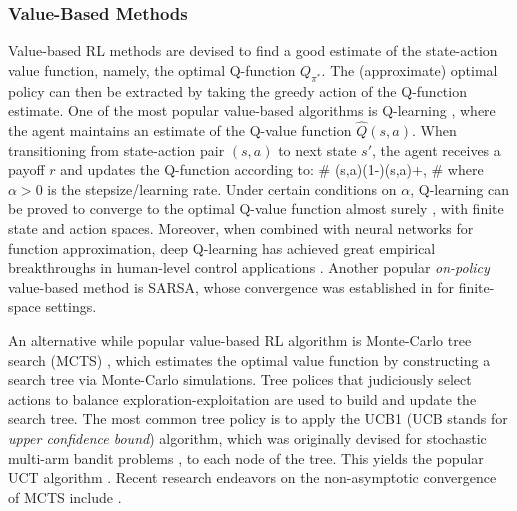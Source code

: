 \subsubsection{Value-Based Methods} \label{eq:value-based-methods}
Value-based RL methods are devised to find a good estimate of the state-action value function, namely, the optimal Q-function $Q_{\pi^*}$. The (approximate) optimal policy can then be extracted by taking the greedy action of the Q-function estimate. One of the most popular value-based algorithms is Q-learning \cite{watkins1992q}, where the agent maintains an estimate of the Q-value function $\hat{Q}(s,a)$. When transitioning  from state-action pair $(s,a)$  to next state $s'$, the agent receives a payoff $r$ and updates the Q-function according to: 
\#\label{equ:Q_learning}
(s,a)\leftarrow (1-\alpha)(s,a)+\alpha{},
\#
where  $\alpha>0$ is the stepsize/learning rate. Under certain conditions on $\alpha$, Q-learning can be proved to converge to the optimal Q-value function almost surely \cite{watkins1992q,szepesvari1999unified}, with  finite state and action spaces. Moreover, when combined with neural networks for function approximation, deep Q-learning has achieved great empirical breakthroughs in  human-level control  applications \cite{mnih2015human}. Another popular \emph{on-policy}  value-based method is SARSA, whose convergence  was established in {\cite{singh2000convergence}} for finite-space settings.  

An alternative while popular value-based RL algorithm is Monte-Carlo tree search (MCTS) \cite{chang2005adaptive,kocsis2006bandit,coulom2006efficient}, which estimates the optimal value function by constructing a search tree via Monte-Carlo simulations. Tree polices that 
judiciously select actions to balance exploration-exploitation are used to build and update the search tree. The most common tree policy is to apply the UCB1
(UCB stands for \emph{upper confidence bound})  algorithm, which was  originally devised for stochastic
multi-arm bandit problems \cite{agrawal1995sample,auer2002finite}, to each node of the tree. This yields the popular UCT algorithm \cite{kocsis2006bandit}.  Recent research endeavors on the non-asymptotic convergence of MCTS include \cite{pmlr-v80-jiang18a,shah2019reinforcement}. 





